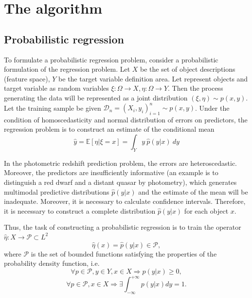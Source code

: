 \documentclass[fleqn,usenatbib]{mnras}
\begin{document}

\section{The algorithm}\label{sec:thealgorithm}

\subsection{Probabilistic regression}
To formulate a probabilistic regression problem, consider a probabilistic formulation of the regression problem. Let \(X\) be the set of object descriptions (feature space), \(Y\) be the target variable definition area. Let represent objects and target variable as random variables \(\xi : \Omega \rightarrow X, \eta : \Omega \rightarrow Y \). Then the process generating the data will be represented as a joint distribution \((\xi, \eta) \sim p(x, y)\). Let the training sample be given \(\mathcal{D}_n = (X_i, y_i)_{i=1}^n \sim p(x,y)\). Under the condition of homoscedasticity and normal distribution of errors on predictors, the regression problem is to construct an estimate of the conditional mean
\begin{equation}\label{eq:regr_classic}
     \hat{y} = \mathbb{E}[\eta | \xi = x] = \int_Y y ~ \hat{p}(y|x) ~ dy
\end{equation}

In the photometric redshift prediction problem, the errors are heteroscedastic. Moreover, the predictors are insufficiently informative (an example is to distinguish a red dwarf and a distant quasar by photometry), which generates multimodal predictive distributions $\hat{p}(y|x)$ and the estimate of the mean will be inadequate. Moreover, it is necessary to calculate confidence intervals. Therefore, it is necessary to construct a complete distribution $\hat{p}(y|x)$ for each object $x$.

Thus, the task of constructing a probabilistic regression is to train the operator \(\hat{\eta} : X \rightarrow \mathcal{P} \subset L^2\)
\begin{equation}
    \hat{\eta}(x) = \hat{p}(y|x) \in \mathcal{P},
\end{equation}
where \(\mathcal{P}\) is the set of bounded functions satisfying the properties of the probability density function, i.e.
\begin{equation}
    \forall p \in \mathcal{P}, y \in Y, x \in X \Rightarrow p(y|x) \geq 0,
\end{equation}
\begin{equation}
    \forall p \in \mathcal{P}, x \in X \Rightarrow \exists \int_{-\infty}^{+\infty} p(y|x) dy = 1.
\end{equation}
\end{document}
